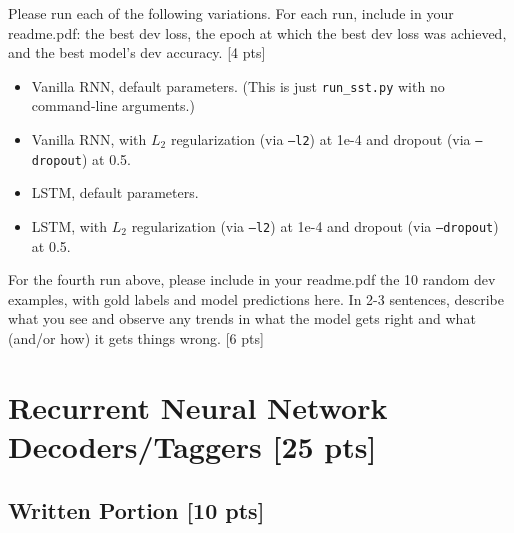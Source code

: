 \documentclass[11pt]{article}
\begin{document}
\noindent Please run each of the following variations.  For each run, include in your readme.pdf: the best dev loss, the epoch at which the best dev loss was achieved, and the best model's dev accuracy. \hfill [4 pts]
\begin{itemize}
  \item Vanilla RNN, default parameters.  (This is just \texttt{run\_sst.py} with no command-line arguments.)
  \item Vanilla RNN, with $L_2$ regularization (via \texttt{--l2}) at 1e-4 and dropout (via \texttt{--dropout}) at 0.5.
  \item LSTM, default parameters. 
  \item LSTM, with $L_2$ regularization (via \texttt{--l2}) at 1e-4 and dropout (via \texttt{--dropout}) at 0.5.
\end{itemize}

\vspace{2em}
 For the fourth run above, please include in your readme.pdf the 10 random dev examples, with gold labels and model predictions here.  In 2-3 sentences, describe what you see and observe any trends in what the model gets right and what (and/or how) it gets things wrong. \hfill [6 pts]


\section{Recurrent Neural Network Decoders/Taggers [25 pts]}

\subsection{Written Portion [10 pts]}
\end{document}
